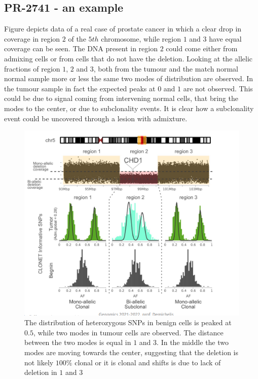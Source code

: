 	\subsection{PR-2741 - an example}
	Figure \label{fig:adm} depicts data of a real case of prostate cancer in which a clear drop in coverage in region $2$ of the $5th$ chromosome, while region $1$ and $3$ have equal coverage can be seen.
	The DNA present in region $2$ could come either from admixing cells or from cells that do not have the deletion.
	Looking at the allelic fractions of region $1$, $2$ and $3$, both from the tumour and the match normal normal sample more or less the same two modes of distribution are observed.
	In the tumour sample in fact the expected peaks at $0$ and $1$ are not observed.
	This could be due to signal coming from intervening normal cells, that bring the modes to the center, or due to subclonality events.
	It is clear how a subclonality event could be uncovered through a lesion with admixture.

	\begin{figure}[H]
		\centering
		\includegraphics[width=0.7\linewidth]{PR_2741.png}
		\caption{The distribution of heterozygous SNPs in benign cells is peaked at $0.5$, while two modes in tumour cells are observed. The distance between the two modes is equal in $1$ and $3$. In the middle the two modes are moving towards the center, suggesting that the deletion is not likely $100\%$ clonal or it is clonal and shifts is due to lack of deletion in $1$ and $3$}
		\label{fig:adm}
	\end{figure}
